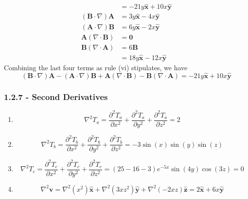 \documentclass[a4paper]{article}
\begin{document}
\begin{enumerate}[label=(\alph*)]
\begin{align*}
									      & = \boxed{-21y \pmb{\hat{x}} + 10x \pmb{\hat{y}}} \\ 
			\boxed{\!\left( \pmb{B} \cdot \nabla \right)\pmb{A}} & = \boxed{3y \pmb{\hat{x}} - 4x \pmb{\hat{y}}} \\
			\boxed{\!\left( \pmb{A} \cdot \nabla \right)\pmb{B}} & = \boxed{6y \pmb{\hat{x}} - 2x \pmb{\hat{y}}} \\
			\boxed{\pmb{A}\!\left( \nabla \cdot \pmb{B} \right)} & = \boxed{\pmb{0}} \\
			\boxed{\pmb{B}\!\left( \nabla \cdot \pmb{A} \right)} & = 6 \pmb{B} \\
									     & = \boxed{18y \pmb{\hat{x}} - 12x \pmb{\hat{y}}}
	\end{align*}
	Combining the last four terms as rule (vi) stipulates, we have
	\[
		\!\left( \pmb{B} \cdot \nabla \right)\pmb{A} - \!\left( \pmb{A} \cdot \nabla \right)\pmb{B} + \pmb{A}\!\left( \nabla \cdot \pmb{B} \right) - \pmb{B}\!\left( \nabla \cdot \pmb{A} \right) = -21y \pmb{\hat{x}} + 10x \pmb{\hat{y}} 
	\]
\end{enumerate}

\subsubsection{\textsf{1.2.7 - Second Derivatives}}

\begin{enumerate}[label=(\alph*)]
	\item \[
		\nabla^{2}T_{a} = \frac{\partial^2 T_{a}}{\partial x^2} + \frac{\partial^2 T_{a}}{\partial y^2} + \frac{\partial^2 T_{a}}{\partial z^2} = 2
	\]
	\item \[
		\nabla^{2}T_{b} = \frac{\partial^2 T_{b}}{\partial x^2} + \frac{\partial^2 T_{b}}{\partial y^2} + \frac{\partial^2 T_{b}}{\partial z^2} = -3 \sin\!\left(x\right)\sin\!\left(y\right)\sin\!\left(z\right)
	\]
	\item \[
		\nabla^{2}T_{c} = \frac{\partial^2 T_{c}}{\partial x^2} + \frac{\partial^2 T_{c}}{\partial y^2} + \frac{\partial^2 T_{c}}{\partial z^2} = \!\left( 25 - 16 - 3 \right)e^{-5x}\sin\!\left(4y\right)\cos\!\left(3z\right) = 0 
	\]
	\item \[
		\nabla^{2}\pmb{v} = \nabla^{2}\!\left( x^{2} \right)\pmb{\hat{x}} + \nabla^{2}\!\left( 3xz^{2} \right)\pmb{\hat{y}} + \nabla^{2}\!\left( -2xz \right)\pmb{\hat{z}} = 2 \pmb{\hat{x}} + 6x \pmb{\hat{y}}
	\]
\end{enumerate}
\end{document}
